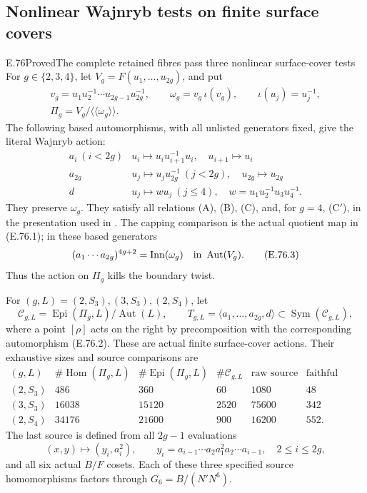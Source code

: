 \subsection{Nonlinear Wajnryb tests on finite surface covers}
\begin{statement}{E.76}{Proved}{The complete retained fibres pass three nonlinear surface-cover tests}
For $g\in\{2,3,4\}$, let $V_g=F(u_1,\ldots,u_{2g})$, and put
\[
 \begin{gathered}
 v_g=u_1u_2^{-1}\cdots u_{2g-1}u_{2g}^{-1},\qquad
 \omega_g=v_g\,\iota(v_g),\qquad \iota(u_j)=u_j^{-1},\\
 \Pi_g=V_g/\langle\!\langle\omega_g\rangle\!\rangle.
 \end{gathered}
 \tag{E.76.1}
\]
The following based automorphisms, with all unlisted generators fixed,
give the literal Wajnryb action:
\[
\begin{array}{c|l}
 a_i\ (i<2g)&u_i\mapsto u_i u_{i+1}^{-1}u_i,
                  \quad u_{i+1}\mapsto u_i\\
 a_{2g}&u_j\mapsto u_j u_{2g}^{-1}\ (j<2g),
                  \quad u_{2g}\mapsto u_{2g}\\
 d&u_j\mapsto w u_j\ (j\leq4),
                  \quad w=u_1u_2^{-1}u_3u_4^{-1}.
\end{array}
 \tag{E.76.2}
\]
They preserve $\omega_g$.  They satisfy all relations (A), (B), (C),
and, for $g=4$, (C$'$), in the presentation used in
\cite[Theorem 3.1]{DE_LochakNakamuraSchneps2026}.  The capping comparison
is the actual quotient map in (E.76.1); in these based generators
\[
       (a_1\cdots a_{2g})^{4g+2}
                 =\operatorname{Inn}(\omega_g)
                    \quad\hbox{in }\operatorname{Aut}(V_g).
 \tag{E.76.3}
\]
Thus the action on $\Pi_g$ kills the boundary twist.

For $(g,L)=(2,S_3),(3,S_3),(2,S_4)$, let
\[
 \mathscr C_{g,L}
    =\operatorname{Epi}(\Pi_g,L)/\operatorname{Aut}(L),
 \qquad
 T_{g,L}=\langle a_1,\ldots,a_{2g},d\rangle
           \subset\operatorname{Sym}(\mathscr C_{g,L}),
 \tag{E.76.4}
\]
where a point $[\rho]$ acts on the right by precomposition with
the corresponding automorphism (E.76.2).  These are actual finite
surface-cover actions. Their exhaustive sizes and source comparisons
are
\[
\begin{array}{c|r|r|r|r|r}
 (g,L)&\#\operatorname{Hom}(\Pi_g,L)&
 \#\operatorname{Epi}(\Pi_g,L)&\#\mathscr C_{g,L}&
 \text{raw source degree}&\text{faithful source degree}\\ \hline
 (2,S_3)&486&360&60&1080&48\\
 (3,S_3)&16038&15120&2520&75600&342\\
 (2,S_4)&34176&21600&900&16200&552.
\end{array}
 \tag{E.76.5}
\]
The last source is defined from all $2g-1$ evaluations
\[
 (x,y)\longmapsto
    (y_i,a_i^2),\qquad
 y_i=a_{i-1}\cdots a_2 a_1^2a_2\cdots a_{i-1},
             \quad 2\leq i\leq2g,
 \tag{E.76.6}
\]
and all six actual $B/F$ cosets.  Each of these three specified
source homomorphisms factors through $G_6=B/(N'N^6)$.


\end{statement}
